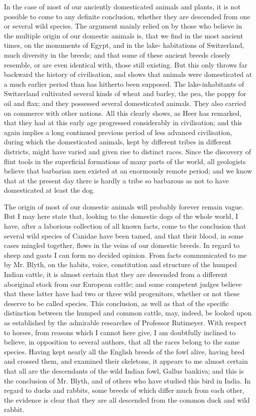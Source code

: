 In the case of most of our anciently domesticated animals and
plants, it is not possible to come to any definite conclusion,
whether they are descended from one or several wild species. The
argument mainly relied on by those who believe in the multiple
origin of our domestic animals is, that we find in the most ancient
times, on the monuments of Egypt, and in the lake- habitations of
Switzerland, much diversity in the breeds; and that some of these
ancient breeds closely resemble, or are even identical with, those
still existing. But this only throws far backward the history of
civilisation, and shows that animals were domesticated at a much
earlier period than has hitherto been supposed. The
lake-inhabitants of Switzerland cultivated several kinds of wheat
and barley, the pea, the poppy for oil and flax; and they possessed
several domesticated animals. They also carried on commerce with
other nations. All this clearly shows, as Heer has remarked, that
they had at this early age progressed considerably in civilisation;
and this again implies a long continued previous period of less
advanced civilisation, during which the domesticated animals, kept
by different tribes in different districts, might have varied and
given rise to distinct races. Since the discovery of flint tools in
the superficial formations of many parts of the world, all
geologists believe that barbarian men existed at an enormously
remote period; and we know that at the present day there is hardly
a tribe so barbarous as not to have domesticated at least the
dog.

The origin of most of our domestic animals will probably forever
remain vague. But I may here state that, looking to the domestic
dogs of the whole world, I have, after a laborious collection of
all known facts, come to the conclusion that several wild species
of Canidae have been tamed, and that their blood, in some cases
mingled together, flows in the veins of our domestic breeds. In
regard to sheep and goats I can form no decided opinion. From facts
communicated to me by Mr. Blyth, on the habits, voice, constitution
and structure of the humped Indian cattle, it is almost certain
that they are descended from a different aboriginal stock from our
European cattle; and some competent judges believe that these
latter have had two or three wild progenitors, whether or not these
deserve to be called species. This conclusion, as well as that of
the specific distinction between the humped and common cattle, may,
indeed, be looked upon as established by the admirable researches
of Professor Rutimeyer. With respect to horses, from reasons which
I cannot here give, I am doubtfully inclined to believe, in
opposition to several authors, that all the races belong to the
same species. Having kept nearly all the English breeds of the fowl
alive, having bred and crossed them, and examined their skeletons,
it appears to me almost certain that all are the descendants of the
wild Indian fowl, Gallus bankiva; and this is the conclusion of Mr.
Blyth, and of others who have studied this bird in India. In regard
to ducks and rabbits, some breeds of which differ much from each
other, the evidence is clear that they are all descended from the
common duck and wild rabbit.


